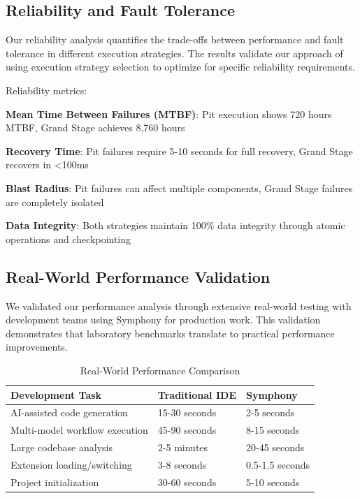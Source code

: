 \subsection*{Reliability and Fault Tolerance}

Our reliability analysis quantifies the trade-offs between performance and fault tolerance in different execution strategies. The results validate our approach of using execution strategy selection to optimize for specific reliability requirements.

Reliability metrics:

\begin{expandedlist}
    \item \textbf{Mean Time Between Failures (MTBF)}: Pit execution shows 720 hours MTBF, Grand Stage achieves 8,760 hours
    \item \textbf{Recovery Time}: Pit failures require 5-10 seconds for full recovery, Grand Stage recovers in <100ms
    \item \textbf{Blast Radius}: Pit failures can affect multiple components, Grand Stage failures are completely isolated
    \item \textbf{Data Integrity}: Both strategies maintain 100\% data integrity through atomic operations and checkpointing
\end{expandedlist}

\subsection*{Real-World Performance Validation}

We validated our performance analysis through extensive real-world testing with development teams using Symphony for production work. This validation demonstrates that laboratory benchmarks translate to practical performance improvements.

\begin{table}[ht]
\centering
\begin{tabular}{@{}lll@{}}
\toprule
\textbf{Development Task} & \textbf{Traditional IDE} & \textbf{Symphony} \\
\midrule
AI-assisted code generation & 15-30 seconds & 2-5 seconds \\
Multi-model workflow execution & 45-90 seconds & 8-15 seconds \\
Large codebase analysis & 2-5 minutes & 20-45 seconds \\
Extension loading/switching & 3-8 seconds & 0.5-1.5 seconds \\
Project initialization & 30-60 seconds & 5-10 seconds \\
\bottomrule
\end{tabular}
\caption{Real-World Performance Comparison}
\end{table}


